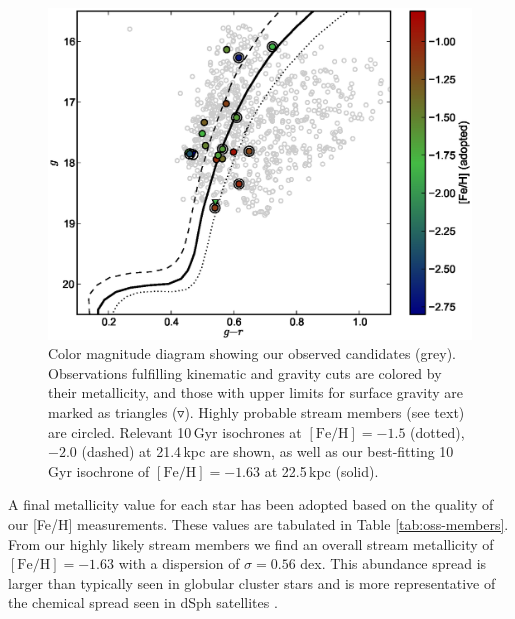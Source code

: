 \documentclass[10pt,apjl]{emulateapj}
\begin{document}
\begin{figure}[t!]
	\includegraphics[width=\columnwidth]{./fig4.eps}
	\caption{Color magnitude diagram showing our observed candidates (grey). Observations fulfilling kinematic and gravity cuts are colored by their metallicity, and those with upper limits for surface gravity are marked as triangles ($\triangledown$). Highly probable stream members (see text) are circled. Relevant 10\,Gyr \citet{Girardi_et-al_2008} isochrones at $[\mbox{Fe/H}] = -1.5$ (dotted), $-2.0$ (dashed) at 21.4\,kpc \citep{Newberg_et-al_2010} are shown, as well as our best-fitting 10\,Gyr isochrone of $[\mbox{Fe/H}] = -1.63$ at 22.5\,kpc (solid).}
	\label{fig:cmd}
\end{figure}

A final metallicity value for each star has been adopted based on the quality of our [Fe/H] measurements. These values are tabulated in Table \ref{tab:oss-members}. From our highly likely stream members we find an overall stream metallicity of $[\mbox{Fe/H}] = -1.63$ with a dispersion of $\sigma = 0.56$ dex. This abundance spread is larger than typically seen in globular cluster stars and is more representative of the chemical spread seen in dSph satellites \citep[e.g.,][]{Frebel_Norris_2011}.



\setlength{\tabcolsep}{2.4pt}
\end{document}
